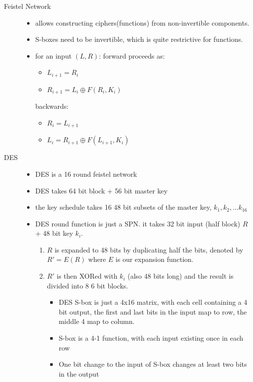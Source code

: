 \documentclass[11pt]{article}
\newcommand{\ee}[1]{\ensuremath{#1}}
\begin{document}
\begin{description}
 \item[Feistel Network] \hfill
 \begin{itemize}
 	\item allows constructing ciphers(functions) from non-invertible components.
 	\item S-boxes need to be invertible, which is quite restrictive for functions.
 	\item for an input \ee{(L, R)}:
 	\subitem forward proceeds as:
 	\begin{itemize}
 		\item \ee{L_{i+1} = R_i}
 		\item \ee{R_{i+1} = L_i \oplus F(R_i, K_i)} 		
 	\end{itemize}
 	\subitem backwards:
 	\begin{itemize}
 		\item \ee{R_i = L_{i+1}}
 		\item \ee{L_i = R_{i+1} \oplus F(L_{i+1}, K_i)}
 	\end{itemize}
 	
 \end{itemize}

\newpage
 
 \item[DES] \hfill
 \begin{itemize}
 	\item DES is a 16 round feistel network
 	\item DES takes 64 bit block + 56 bit master key
 	\item the key schedule takes 16 48 bit subsets of the master key, \ee{k_1, k_2,...k_{16}}
 	\item DES round function is just a SPN. it takes 32 bit input (half block) \ee{R} + 48 bit key \ee{k_i}. \begin{enumerate}
 		\item \ee{R} is expanded to 48 bits by duplicating half the bits, denoted by \ee{R' = E(R)} where \ee{E} is our expansion function.
 		
 		\item \ee{R'} is then XORed with \ee{k_i} (also 48 bits long) and the result is divided into 8 6 bit blocks.
 		\begin{itemize}
 			\item DES S-box is just a 4x16 matrix, with each cell containing a 4 bit output, the first and last bits in the input map to row, the middle 4 map to column. 
 			\item S-box is a 4-1 function, with each input existing once in each row
 			\item One bit change to the input of S-box changes at least two bits in the output
 		\end{itemize}
 	

\end{enumerate}
\end{itemize}
\end{description}
\end{document}
